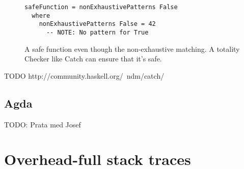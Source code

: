\begin{figure}
      \begin{verbatim}
safeFunction = nonExhaustivePatterns False
  where
    nonExhaustivePatterns False = 42
      -- NOTE: No pattern for True
      \end{verbatim}
      \caption{A safe function even though the non-exhaustive matching. A
        totality Checker like Catch can ensure that it's safe.}
      \label{fig:catch_example}
\end{figure}



TODO http://community.haskell.org/~ndm/catch/

\subsection{Agda}

TODO: Prata med Josef

\section{Overhead-full stack traces}

